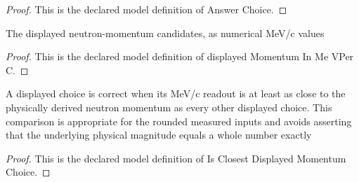 \begin{proof}
  This is the declared model definition of Answer Choice.
\end{proof}
\begin{definition}
  \label{def:physics:phyx-mini-0540:phyxminiproblems-problemphyxmini0540-displayedmomentuminmevperc}
  The displayed neutron-momentum candidates, as numerical MeV/c values
\end{definition}
\begin{proof}
  This is the declared model definition of displayed Momentum In Me VPer C.
\end{proof}
\begin{definition}
  \label{def:physics:phyx-mini-0540:phyxminiproblems-problemphyxmini0540-isclosestdisplayedmomentumchoice}
  A displayed choice is correct when its MeV/c readout is at least as close to the physically derived neutron momentum as every other displayed choice. This comparison is appropriate for the rounded measured inputs and avoids asserting that the underlying physical magnitude equals a whole number exactly
\end{definition}
\begin{proof}
  This is the declared model definition of Is Closest Displayed Momentum Choice.
\end{proof}

